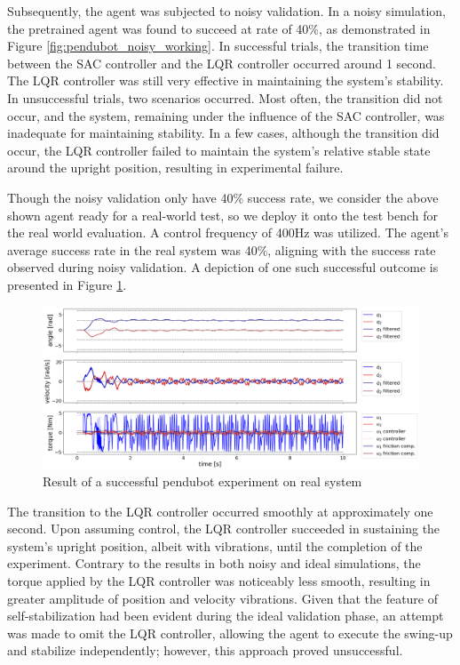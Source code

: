 Subsequently, the agent was subjected to noisy validation. In a noisy simulation, the pretrained agent was found to succeed at rate of 40\%, as demonstrated in Figure \ref{fig:pendubot_noisy_working}. In successful trials, the transition time between the SAC controller and the LQR controller occurred around 1 second. The LQR controller was still very effective in maintaining the system's stability. In unsuccessful trials, two scenarios occurred. Most often, the transition did not occur, and the system, remaining under the influence of the SAC controller, was inadequate for maintaining stability. In a few cases, although the transition did occur, the LQR controller failed to maintain the system's relative stable state around the upright position, resulting in experimental failure.

Though the noisy validation only have 40\% success rate, we consider the above shown agent ready for a real-world test, so we deploy it onto the test bench for the real world evaluation. A control frequency of 400Hz was utilized. The agent's average success rate in the real system was 40\%, aligning with the success rate observed during noisy validation. A depiction of one such successful outcome is presented in Figure \ref{fig:pendubot_real_working}. 

\begin{figure}[H]
    \centering
    \includegraphics[width=1.0\linewidth]{figures/hardware_result/pendubot_real_system_working.png}
    \caption{Result of a successful pendubot experiment on real system}
    \label{fig:pendubot_real_working}
\end{figure}

The transition to the LQR controller occurred smoothly at approximately one second. Upon assuming control, the LQR controller succeeded in sustaining the system's upright position, albeit with vibrations, until the completion of the experiment. Contrary to the results in both noisy and ideal simulations, the torque applied by the LQR controller was noticeably less smooth, resulting in greater amplitude of position and velocity vibrations. Given that the feature of self-stabilization had been evident during the ideal validation phase, an attempt was made to omit the LQR controller, allowing the agent to execute the swing-up and stabilize independently; however, this approach proved unsuccessful.

